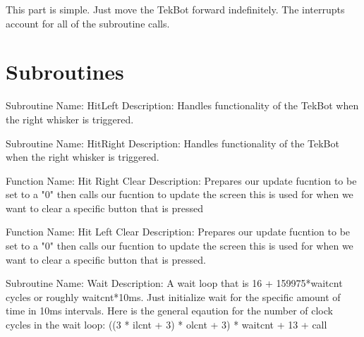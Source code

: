\documentclass[12pt, letterpaper]{article}
\begin{document}
This part is simple. Just move the TekBot forward indefinitely. The interrupts account for all of the subroutine calls.





\section{Subroutines}

Subroutine Name: HitLeft \newline
Description: Handles functionality of the TekBot when the right whisker	is triggered. \newline

Subroutine Name: HitRight \newline
Description: Handles functionality of the TekBot when the right whisker is triggered. \newline

Function Name: Hit Right Clear \newline
Description: Prepares our update fucntion to be set to a "0" then calls our fucntion to update the screen this is used for when we want to clear a specific button that is pressed \newline

Function Name: Hit Left Clear \newline
Description: Prepares our update fucntion to be set to a "0" then calls our fucntion to update the screen this is used for when we want to clear a specific button that is pressed. \newline

Subroutine Name: Wait \newline
Description: A wait loop that is 16 + 159975*waitcnt cycles or roughly waitcnt*10ms.  Just initialize wait for the specific amount of time in 10ms intervals. Here is the general eqaution for the number of clock cycles in the wait loop: ((3 * ilcnt + 3) * olcnt + 3) * waitcnt + 13 + call \newline
\end{document}
